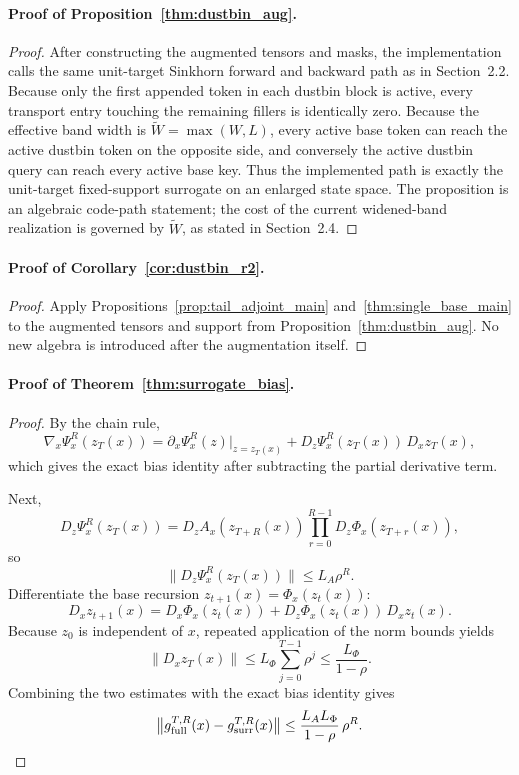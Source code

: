 \paragraph{Proof of Proposition~\ref{thm:dustbin_aug}.}
\begin{proof}
After constructing the augmented tensors and masks, the implementation calls the same unit-target Sinkhorn forward and backward path as in Section~2.2. Because only the first appended token in each dustbin block is active, every transport entry touching the remaining fillers is identically zero. Because the effective band width is $\widetilde W=\max(W,L)$, every active base token can reach the active dustbin token on the opposite side, and conversely the active dustbin query can reach every active base key. Thus the implemented path is exactly the unit-target fixed-support surrogate on an enlarged state space. The proposition is an algebraic code-path statement; the cost of the current widened-band realization is governed by $\widetilde W$, as stated in Section~2.4.
\end{proof}

\paragraph{Proof of Corollary~\ref{cor:dustbin_r2}.}
\begin{proof}
Apply Propositions~\ref{prop:tail_adjoint_main} and~\ref{thm:single_base_main} to the augmented tensors and support from Proposition~\ref{thm:dustbin_aug}. No new algebra is introduced after the augmentation itself.
\end{proof}

\paragraph{Proof of Theorem~\ref{thm:surrogate_bias}.}
\begin{proof}
By the chain rule,
\[
\nabla_x\Psi_x^R(z_T(x))
=
\partial_x \Psi_x^R(z)\big|_{z=z_T(x)}
+
D_z\Psi_x^R(z_T(x))\,D_x z_T(x),
\]
which gives the exact bias identity after subtracting the partial derivative term.

Next,
\[
D_z\Psi_x^R(z_T(x))
=
D_z A_x(z_{T+R}(x))
\prod_{r=0}^{R-1} D_z\Phi_x(z_{T+r}(x)),
\]
so
\[
\|D_z\Psi_x^R(z_T(x))\|
\le
L_A \rho^R.
\]
Differentiate the base recursion $z_{t+1}(x)=\Phi_x(z_t(x))$:
\[
D_x z_{t+1}(x)
=
D_x\Phi_x(z_t(x))
+
D_z\Phi_x(z_t(x))\,D_x z_t(x).
\]
Because $z_0$ is independent of $x$, repeated application of the norm bounds yields
\[
\|D_x z_T(x)\|
\le
L_\Phi \sum_{j=0}^{T-1}\rho^j
\le
\frac{L_\Phi}{1-\rho}.
\]
Combining the two estimates with the exact bias identity gives
\[
\bigl\|g_{\mathrm{full}}^{T,R}(x)-g_{\mathrm{surr}}^{T,R}(x)\bigr\|
\le
\frac{L_A L_\Phi}{1-\rho}\,\rho^R.
\qedhere
\]
\end{proof}

